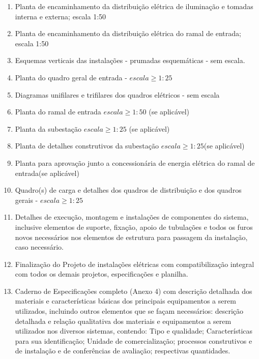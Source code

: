 \begin{enumerate}
	\item Planta de encaminhamento da distribuição elétrica de iluminação e tomadas interna e externa; escala 1:50

	\item Planta de encaminhamento da distribuição elétrica do ramal de entrada; escala 1:50

	\item Esquemas verticais das instalações - prumadas esquemáticas - sem escala.

	\item Planta do quadro geral de entrada - $escala \geq 1:25$

	\item Diagramas unifilares e trifilares dos quadros elétricos - sem escala 

	\item Planta do ramal de entrada $escala \geq 1:50$ (se aplicável)

	\item Planta da subestação $escala \geq 1:25$ (se aplicável)

	\item Planta de detalhes construtivos da subestação $escala \geq 1:25$(se aplicável)

	\item Planta para aprovação junto a concessionária de energia elétrica do ramal de entrada(se aplicável)

	\item Quadro(s) de carga e detalhes dos quadros de distribuição e dos quadros gerais - $escala \geq 1:25$

	\item Detalhes de execução, montagem e instalações de componentes do sistema, inclusive elementos de suporte, fixação, apoio de tubulações e todos os furos novos necessários nos elementos de estrutura para passagem da instalação, caso necessário.

	\item Finalização do Projeto de instalações elétricas com compatibilização integral com todos os demais projetos, especificações e planilha.

	\item Caderno de Especificações completo (Anexo 4) com descrição detalhada dos materiais e características básicas dos principais equipamentos a serem utilizados, incluindo outros elementos que se façam necessários: descrição detalhada e relação qualitativa dos materiais e equipamentos a serem utilizados nos diversos sistemas, contendo: Tipo e qualidade; Características para sua identificação; Unidade de comercialização; processos construtivos e de instalação e de conferências de avaliação; respectivas quantidades.
	

\end{enumerate}
